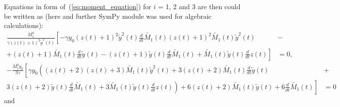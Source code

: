 \documentclass[12pt, letterpaper]{article}
\begin{document}
\noindent Equations in form of~(\ref{eq:moment_equation}) for $i$ = 1, 2 and 3 are then could be written as (here and further SymPy module was used for algebraic calculations):
\begin{equation}
\begin{aligned}
\frac{M^{0}_{1}}{\gamma (z(t) + 1)^{2} \tilde{y}^{2}(t)}
\left[ - \gamma y_{0} (z(t) + 1)^{2} \tilde{y}^{2}(t) \frac{d}{d t} \tilde{M_1}(t) \right. (z(t) + 1)^{2} \tilde{M_1}(t) \tilde{y}^{2}(t) & - \\
 + (z(t) + 1) \tilde{M_1}(t) \frac{d}{d t} \tilde{y}(t) -
\left. (z(t) + 1) \tilde{y}(t) \frac{d}{d t} \tilde{M_1}(t) + \tilde{M_1}(t) \tilde{y}(t) \frac{d}{d t} z(t) \right] & = 0,
\end{aligned}
\end{equation}
\begin{equation}
\begin{aligned}
- \frac{M^{0}_{1} y_{0}}{3 \gamma}
\left[\gamma y_{0} \left(\left(z{\left(t \right)} + 2\right) \left(z{\left(t \right)} + 3\right) \tilde{M_1}{\left(t \right)} \tilde{y}^{2}{\left(t \right)} + 3 \left(z{\left(t \right)} + 2\right) \tilde{M_1}{\left(t \right)} \frac{d}{d t} \tilde{y}{\left(t \right)} \right. \right. & + \\
\left. \left. 3 \left(z{\left(t \right)} + 2\right) \tilde{y}{\left(t \right)} \frac{d}{d t} \tilde{M_1}{\left(t \right)} + 3 \tilde{M_1}{\left(t \right)} \tilde{y}{\left(t \right)} \frac{d}{d t} z{\left(t \right)}\right) + 6 \left(z{\left(t \right)} + 2\right) \tilde{M_1}{\left(t \right)} \tilde{y}{\left(t \right)} + 6 \frac{d}{d t} \tilde{M_1}{\left(t \right)}\right] & = 0
\end{aligned}
\end{equation}
and
\end{document}
